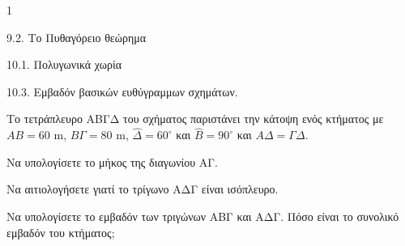 \begin{ylh}{1}
    \item 9.2. Το Πυθαγόρειο θεώρημα
    \item 10.1. Πολυγωνικά χωρία
    \item 10.3. Εμβαδόν βασικών ευθύγραμμων σχημάτων.
\end{ylh}
\begin{figure} %
    \centering
\end{figure}
Το τετράπλευρο ΑΒΓΔ του σχήματος παριστάνει την κάτοψη ενός κτήματος με $AB = 60 \text{ m}$, $B\Gamma = 80 \text{ m}$, $\hat{\Delta} = 60^\circ$ και $\hat{B} = 90^\circ$ και $A\Delta = \Gamma\Delta$.
\begin{alist}
    \item Να υπολογίσετε το μήκος της διαγωνίου ΑΓ. 
    \item Να αιτιολογήσετε γιατί το τρίγωνο ΑΔΓ είναι ισόπλευρο. 
    \item Να υπολογίσετε το εμβαδόν των τριγώνων ΑΒΓ και ΑΔΓ. Πόσο είναι το συνολικό εμβαδόν του κτήματος; 
\end{alist}